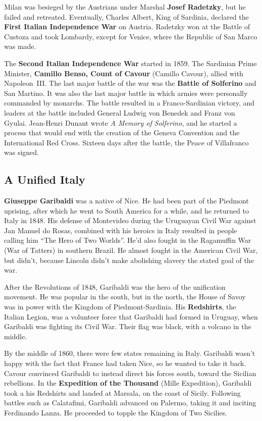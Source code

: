 Milan was besieged by the Austrians under Marshal \textbf{Josef Radetzky}, but he failed and retreated.
Eventually, Charles Albert, King of Sardinia, declared the \textbf{First Italian Independence War} on Austria.
Radetzky won at the Battle of Custoza and took Lombardy, except for Venice, where the Republic of San Marco was made.

The \textbf{Second Italian Independence War} started in 1859.
The Sardinian Prime Minister, \textbf{Camillo Benso, Count of Cavour} (Camillo Cavour), allied with Napoleon~III\@.
The last major battle of the war was the \textbf{Battle of Solferino} and San Martino.
It was also the last major battle in which armies were personally commanded by monarchs.
The battle resulted in a Franco-Sardinian victory,
and leaders at the battle included General Ludwig von Benedek and Franz von Gyulai.
Jean-Henri Dunant wrote \textit{A Memory of Solferino},
and he started a process that would end with the creation of the Geneva Convention and the International Red Cross.
Sixteen days after the battle, the Peace of Villafranco was signed.

\subsection*{A Unified Italy}

\textbf{Giuseppe Garibaldi} was a native of Nice.
He had been part of the Piedmont uprising, after which he went to South America for a while,
and he returned to Italy in 1848.
His defense of Montevideo during the Uruguayan Civil War against Jan Manuel do Rosas,
combined with his heroics in Italy resulted in people calling him ``The Hero of Two Worlds''.
He'd also fought in the Ragamuffin War (War of Tatters) in southern Brazil.
He almost fought in the American Civil War, but didn't,
because Lincoln didn't make abolishing slavery the stated goal of the war.

After the Revolutions of 1848, Garibaldi was the hero of the unification movement.
He was popular in the south, but in the north, the House of Savoy was in power with the Kingdom of Piedmont-Sardinia.
His \textbf{Redshirts}, the Italian Legion, was a volunteer force that Garibaldi had formed in Uruguay,
when Garibaldi was fighting its Civil War.
Their flag was black, with a volcano in the middle.

By the middle of 1860, there were few states remaining in Italy.
Garibaldi wasn't happy with the fact that France had taken Nice, so he wanted to take it back.
Cavour convinced Garibaldi to instead direct his forces south, toward the Sicilian rebellions.
In the \textbf{Expedition of the Thousand} (Mille Expedition),
Garibaldi took a his Redshirts and landed at Marsala, on the coast of Sicily.
Following battles such as Calatafimi, Garibaldi advanced on Palermo, taking it and inciting Ferdinando Lanza.
He proceeded to topple the Kingdom of Two Sicilies.

